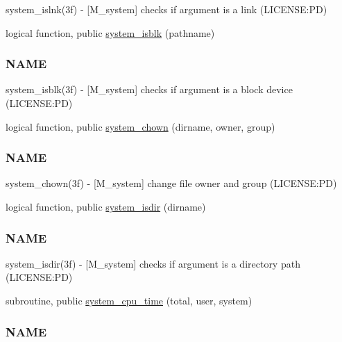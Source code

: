 \begin{DoxyCompactItemize}
\begin{DoxyCompactList}
system\+\_\+islnk(3f) -\/ \mbox{[}M\+\_\+system\mbox{]} checks if argument is a link (L\+I\+C\+E\+N\+SE\+:PD) \end{DoxyCompactList}\item 
logical function, public \mbox{\hyperlink{namespacem__system_a791fa587005ec07cbcd7b0045ee6f43f}{system\+\_\+isblk}} (pathname)
\begin{DoxyCompactList}\small\item\em \subsubsection*{N\+A\+ME}

system\+\_\+isblk(3f) -\/ \mbox{[}M\+\_\+system\mbox{]} checks if argument is a block device (L\+I\+C\+E\+N\+SE\+:PD) \end{DoxyCompactList}\item 
logical function, public \mbox{\hyperlink{namespacem__system_a3353c1cff032fcfe2985a69f10038ddd}{system\+\_\+chown}} (dirname, owner, group)
\begin{DoxyCompactList}\small\item\em \subsubsection*{N\+A\+ME}

system\+\_\+chown(3f) -\/ \mbox{[}M\+\_\+system\mbox{]} change file owner and group (L\+I\+C\+E\+N\+SE\+:PD) \end{DoxyCompactList}\item 
logical function, public \mbox{\hyperlink{namespacem__system_ad097988a031e64b4f21f856cf45c9c73}{system\+\_\+isdir}} (dirname)
\begin{DoxyCompactList}\small\item\em \subsubsection*{N\+A\+ME}

system\+\_\+isdir(3f) -\/ \mbox{[}M\+\_\+system\mbox{]} checks if argument is a directory path (L\+I\+C\+E\+N\+SE\+:PD) \end{DoxyCompactList}\item 
subroutine, public \mbox{\hyperlink{namespacem__system_a257d2b8987db850bc686507f19ccbe4a}{system\+\_\+cpu\+\_\+time}} (total, user, system)
\begin{DoxyCompactList}\small\item\em \subsubsection*{N\+A\+ME}


\end{DoxyCompactList}
\end{DoxyCompactItemize}
